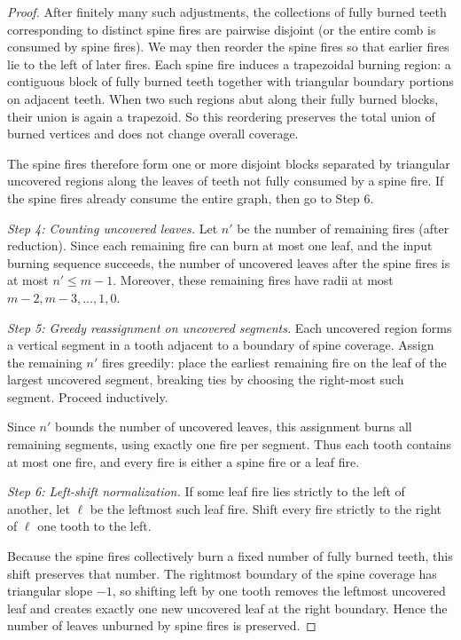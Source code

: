 \documentclass[10pt,a4paper]{amsart}
\begin{document}
\begin{proof}
After finitely many such adjustments, the collections of fully burned teeth
corresponding to distinct spine fires are pairwise disjoint (or the entire comb is consumed by spine fires).
We may then reorder the spine fires so that earlier fires lie to the left of later fires.
Each spine fire induces a trapezoidal burning region: a contiguous block of fully burned teeth together with triangular boundary portions on adjacent teeth.
When two such regions abut along their fully burned blocks,
their union is again a trapezoid.
So this reordering preserves the total union of burned vertices and does not change overall coverage.

The spine fires therefore form one or more disjoint blocks
separated by triangular uncovered regions along the leaves of teeth not fully consumed by a spine fire. If the spine fires  already consume the entire graph, then go to Step 6.

\medskip
\noindent
\emph{Step 4: Counting uncovered leaves.}
Let $n'$ be the number of remaining fires (after reduction).
Since each remaining fire can burn at most one leaf,
and the input burning sequence succeeds,
the number of uncovered leaves after the spine fires
is at most $n' \le m-1$.
Moreover, these remaining fires have radii at most
$m-2,m-3,\dots,1,0$.

\medskip
\noindent
\emph{Step 5: Greedy reassignment on uncovered segments.}
Each uncovered region forms a vertical segment
in a tooth adjacent to a boundary of spine coverage.
Assign the remaining $n'$ fires greedily:
place the earliest remaining fire
on the leaf of the largest uncovered segment,
breaking ties by choosing the right-most such segment.
Proceed inductively.

Since $n'$ bounds the number of uncovered leaves,
this assignment burns all remaining segments,
using exactly one fire per segment.
Thus each tooth contains at most one fire,
and every fire is either a spine fire or a leaf fire.

\medskip
\noindent
\emph{Step 6: Left-shift normalization.}
If some leaf fire lies strictly to the left of another,
let $\ell$ be the leftmost such leaf fire.
Shift every fire strictly to the right of $\ell$
one tooth to the left.

Because the spine fires collectively burn
a fixed number of fully burned teeth,
this shift preserves that number.
The rightmost boundary of the spine coverage
has triangular slope $-1$,
so shifting left by one tooth removes the leftmost uncovered leaf
and creates exactly one new uncovered leaf at the right boundary.
Hence the number of leaves unburned by spine fires is preserved.


\end{proof}
\end{document}
